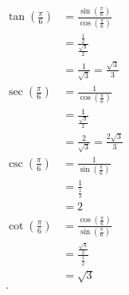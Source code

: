 \begin{solution}
	\label{sol:find_tan_sec_csc_cot_1}

	\begin{align*}
		\tan \left(\frac{\pi}{6}\right) & = \frac{\sin \left(\frac{\pi}{6}\right)}{\cos \left(\frac{\pi}{6}\right)} \\
		                                & = \frac{\frac{1}{2}}{\frac{\sqrt{3}}{2}}                                  \\
		                                & = \frac{1}{\sqrt{3}} = \frac{\sqrt{3}}{3}                                 \\
		\sec \left(\frac{\pi}{6}\right) & = \frac{1}{\cos \left(\frac{\pi}{6}\right)}                               \\
		                                & = \frac{1}{\frac{\sqrt{3}}{2}}                                            \\
		                                & = \frac{2}{\sqrt{3}} = \frac{2\sqrt{3}}{3}                                \\
		\csc \left(\frac{\pi}{6}\right) & = \frac{1}{\sin \left(\frac{\pi}{6}\right)}                               \\
		                                & = \frac{1}{\frac{1}{2}}                                                   \\
		                                & = 2                                                                       \\
		\cot \left(\frac{\pi}{6}\right) & = \frac{\cos \left(\frac{\pi}{6}\right)}{\sin \left(\frac{\pi}{6}\right)} \\
		                                & = \frac{\frac{\sqrt{3}}{2}}{\frac{1}{2}}                                  \\
		                                & = \sqrt{3}                                                                \\
		.\end{align*}
\end{solution}

